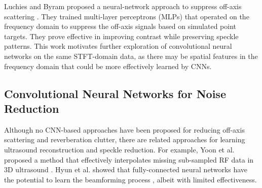 Luchies and Byram proposed a neural-network approach to suppress off-axis scattering \cite{luchies_tmi_2018, training_improvements}. They trained multi-layer perceptrons (MLPs) that operated on the frequency domain to suppress the off-axis signals based on simulated point targets. They prove effective in improving contrast while preserving speckle patterns. This work motivates further exploration of convolutional neural networks on the same STFT-domain data, as there may be spatial features in the frequency domain that could be more effectively learned by CNNs.

\subsection{Convolutional Neural Networks for Noise Reduction}

Although no CNN-based approaches have been proposed for reducing off-axis scattering and reverberation clutter, there are related approaches for learning ultrasound reconstruction and speckle reduction. For example, Yoon et al. proposed a method that effectively interpolates missing sub-sampled RF data in 3D ultrasound \cite{yoon2018efficient}. Hyun et al. showed that fully-connected neural networks have the potential to learn the beamforming process \cite{hyun2019beamforming}, albeit with limited effectiveness.

%
%
%



